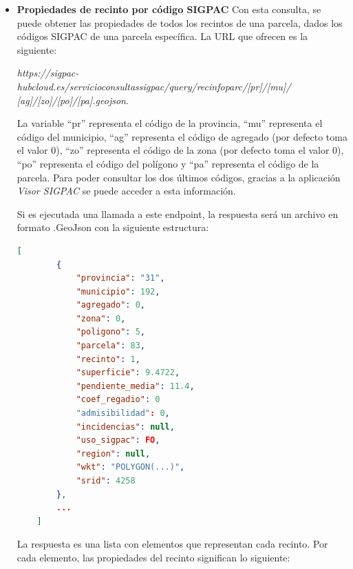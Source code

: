 \begin{itemize}
    \item \textbf{Propiedades de recinto por código SIGPAC}
    \newline
    Con esta consulta, se puede obtener las propiedades de todos los recintos de una parcela, dados los códigos
    SIGPAC de una parcela específica.
    La URL que ofrecen es la siguiente:

    \textit{https://sigpac-hubcloud.es/servicioconsultassigpac/query/recinfoparc/[pr]/[mu]/
    [ag]/[zo]/[po]/[pa].geojson}.
    
    La variable ``pr'' representa el código de la provincia, ``mu'' representa el código del municipio, ``ag'' 
    representa el código de agregado (por defecto toma el valor 0), ``zo'' representa el código de la zona (por
    defecto toma el valor 0), ``po'' representa el código del polígono y ``pa'' representa el código de la parcela.
    Para poder consultar los dos últimos códigos, gracias a la aplicación \textit{Visor SIGPAC} se puede acceder
    a esta información.

    Si es ejecutada una llamada a este endpoint, la respuesta será un archivo en formato .GeoJson con la siguiente
    estructura:
    
    \begin{lstlisting}[language=json,caption={Propiedades de los recintos de una parcela}]
    [
        {
            "provincia": "31",
            "municipio": 192,
            "agregado": 0,
            "zona": 0,
            "poligono": 5,
            "parcela": 83,
            "recinto": 1,
            "superficie": 9.4722,
            "pendiente_media": 11.4,
            "coef_regadio": 0
            "admisibilidad": 0,
            "incidencias": null,
            "uso_sigpac": FO,
            "region": null,
            "wkt": "POLYGON(...)",
            "srid": 4258
        },
        ...
    ]
    \end{lstlisting}

    La respuesta es una lista con elementos que representan cada recinto. Por cada elemento, las propiedades del 
    recinto significan lo siguiente:


\end{itemize}
